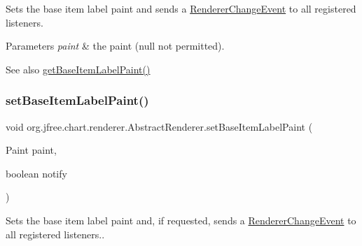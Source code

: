 Sets the base item label paint and sends a \mbox{\hyperlink{}{Renderer\+Change\+Event}} to all registered listeners.


\begin{DoxyParams}{Parameters}
{\em paint} & the paint ({\ttfamily null} not permitted).\\
\hline
\end{DoxyParams}
\begin{DoxySeeAlso}{See also}
\mbox{\hyperlink{classorg_1_1jfree_1_1chart_1_1renderer_1_1_abstract_renderer_a553eba1baf9f5d241c06a77c80a223d6}{get\+Base\+Item\+Label\+Paint()}} 
\end{DoxySeeAlso}
\mbox{\label{classorg_1_1jfree_1_1chart_1_1renderer_1_1_abstract_renderer_a4d1aac1ee560b81daea409e8a28a4038}} 
\subsubsection{\texorpdfstring{set\+Base\+Item\+Label\+Paint()}{setBaseItemLabelPaint()}\hspace{0.1cm}{\footnotesize\ttfamily [2/2]}}
{\footnotesize\ttfamily void org.\+jfree.\+chart.\+renderer.\+Abstract\+Renderer.\+set\+Base\+Item\+Label\+Paint (\begin{DoxyParamCaption}\item[{Paint}]{paint,  }\item[{boolean}]{notify }\end{DoxyParamCaption})}

Sets the base item label paint and, if requested, sends a \mbox{\hyperlink{}{Renderer\+Change\+Event}} to all registered listeners..


